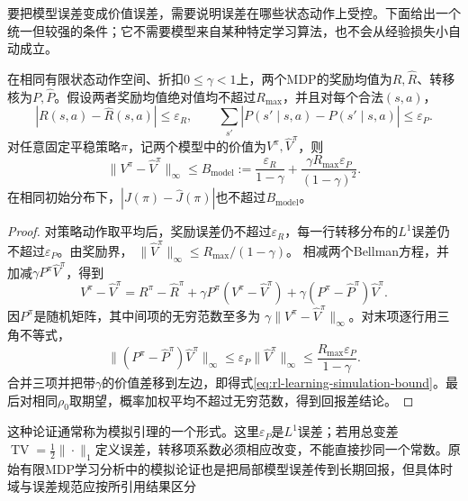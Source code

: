 要把模型误差变成价值误差，需要说明误差在哪些状态动作上受控。下面给出一个统一但较强的条件；它不需要模型来自某种特定学习算法，也不会从经验损失小自动成立。

\begin{theorem}[固定策略的模型误差界]
  \label{thm:rl-learning-simulation}
  在相同有限状态动作空间、折扣$0\leq\gamma<1$上，两个MDP的奖励均值为$R,\widehat R$、转移核为$P,\widehat P$。假设两者奖励均值绝对值均不超过$R_{\max}$，并且对每个合法$(s,a)$，
  \[
    |R(s,a)-\widehat R(s,a)|\leq\varepsilon_R,\qquad
    \sum_{s'}|P(s'\mid s,a)-\widehat P(s'\mid s,a)|
       \leq\varepsilon_P.
  \]
  对任意固定平稳策略$\pi$，记两个模型中的价值为$V^\pi,\widehat V^\pi$，则
  \begin{equation}
    \|V^\pi-\widehat V^\pi\|_\infty
       \leq B_{\mathrm{model}}
       :=\frac{\varepsilon_R}{1-\gamma}
        +\frac{\gamma R_{\max}\varepsilon_P}{(1-\gamma)^2}.
    \label{eq:rl-learning-simulation-bound}
  \end{equation}
  在相同初始分布下，$|J(\pi)-\widehat J(\pi)|$也不超过$B_{\mathrm{model}}$。
\end{theorem}

\begin{proof}
  对策略动作取平均后，奖励误差仍不超过$\varepsilon_R$，每一行转移分布的$L^1$误差仍不超过$\varepsilon_P$。由奖励界，
  $\|\widehat V^\pi\|_\infty\leq R_{\max}/(1-\gamma)$。
  相减两个Bellman方程，并加减$\gamma P^\pi\widehat V^\pi$，得到
  \[
    V^\pi-\widehat V^\pi
     =R^\pi-\widehat R^\pi
       +\gamma P^\pi(V^\pi-\widehat V^\pi)
       +\gamma(P^\pi-\widehat P^\pi)\widehat V^\pi .
  \]
  因$P^\pi$是随机矩阵，其中间项的无穷范数至多为
  $\gamma\|V^\pi-\widehat V^\pi\|_\infty$。对末项逐行用三角不等式，
  \[
    \|(P^\pi-\widehat P^\pi)\widehat V^\pi\|_\infty
      \leq\varepsilon_P\|\widehat V^\pi\|_\infty
      \leq\frac{R_{\max}\varepsilon_P}{1-\gamma}.
  \]
  合并三项并把带$\gamma$的价值差移到左边，即得式\eqref{eq:rl-learning-simulation-bound}。最后对相同$\rho_0$取期望，概率加权平均不超过无穷范数，得到回报差结论。
\end{proof}

这种论证通常称为模拟引理的一个形式。这里$\varepsilon_P$是$L^1$误差；若用总变差$\operatorname{TV}=\tfrac12\|\cdot\|_1$定义误差，转移项系数必须相应改变，不能直接抄同一个常数。原始有限MDP学习分析中的模拟论证也是把局部模型误差传到长期回报，但具体时域与误差规范应按所引用结果区分

